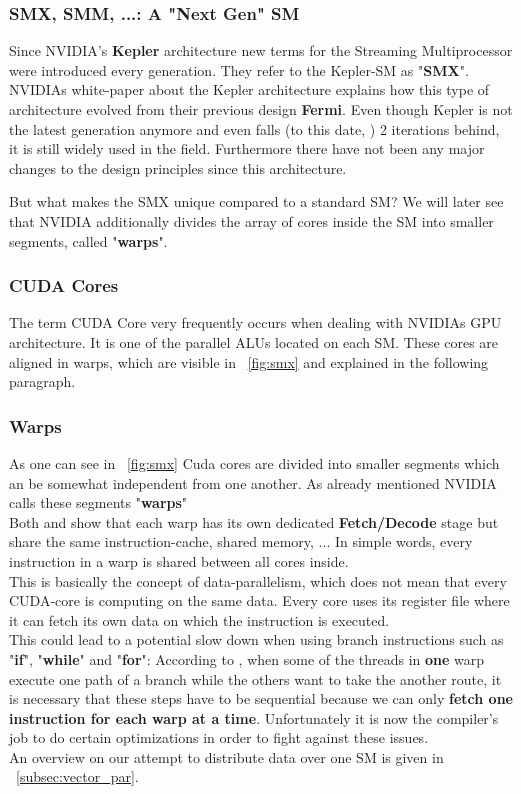 \documentclass[draft, final]{vutinfth} %
\begin{document}
			\subsubsection{SMX, SMM, ...: A "Next Gen" SM}
				Since NVIDIA's \textbf{Kepler} architecture new terms for the Streaming Multiprocessor were introduced every generation. They refer to the Kepler-SM as "\textbf{SMX}". NVIDIAs white-paper \cite{nvidia_kepler_2012} about the Kepler architecture explains how this type of architecture evolved from their previous design \textbf{Fermi}. Even though Kepler is not the latest generation anymore and even falls (to this date, \cite{nvidia_kepler_2012}) 2 iterations behind, it is still widely used in the field. Furthermore there have not been any major changes to the design principles since this architecture.

				But what makes the SMX unique compared to a standard SM? We will later see that NVIDIA additionally divides the array of cores inside the SM into smaller segments, called "\textbf{warps}".

			\subsubsection{CUDA Cores}
				The term CUDA Core very frequently occurs when dealing with NVIDIAs GPU architecture. It is one of the parallel ALUs located on each SM. These cores are aligned in warps, which are visible in ~\ref{fig:smx} and explained in the following paragraph.

			\subsubsection{Warps}
				As one can see in ~\ref{fig:smx} Cuda cores are divided into smaller segments which an be somewhat independent from one another. As already mentioned NVIDIA calls these segments "\textbf{warps}"\\
				Both \cite{Introduction-to-GPUs} and \cite{nvidia_kepler_2012} show that each warp has its own dedicated \textbf{Fetch/Decode} stage but share the same instruction-cache, shared memory, ... In simple words, every instruction in a warp is shared between all cores inside.\\
				This is basically the concept of data-parallelism, which does not mean that every CUDA-core is computing on the same data. Every core uses its register file where it can fetch its own data on which the instruction is executed.\\
				This could lead to a potential slow down when using branch instructions such as "\textbf{if}", "\textbf{while}" and "\textbf{for}": According to \cite{Kirk:2010:PMP:1841511}, when some of the threads in \textbf{one} warp execute one path of a branch while the others want to take the another route, it is necessary that these steps have to be sequential because we can only \textbf{fetch one instruction for each warp at a time}. Unfortunately it is now the compiler's job to do certain optimizations in order to fight against these issues.\\
				An overview on our attempt to distribute data over one SM is given in ~\ref{subsec:vector_par}.
\end{document}
